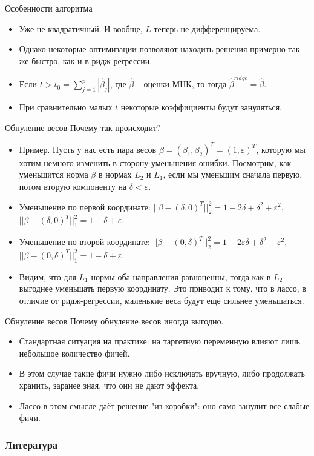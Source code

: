 \documentclass[9pt]{beamer}
\begin{document}
\begin{frame}{Особенности алгоритма}
\begin{itemize}
    \item Уже не квадратичный. И вообще, $L$ теперь не дифференцируема.
    \item Однако некоторые оптимизации позволяют находить решения примерно так же быстро, как и в ридж-регрессии.
    \item Если $t > t_0 = \sum_{j=1}^p|\hat\beta_j|$, где $\hat\beta$ -- оценки МНК, то тогда $\hat\beta^{ridge}=\hat\beta$.
    \item При сравнительно малых $t$ некоторые коэффициенты будут зануляться.
\end{itemize}
\end{frame}

\begin{frame}{Обнуление весов}
Почему так происходит?
\begin{itemize}
    \item Пример. Пусть у нас есть пара весов $\beta = (\beta_1, \beta_2)^T = (1, \varepsilon)^T$, которую мы хотим немного изменить в сторону уменьшения ошибки. Посмотрим, как уменьшится норма $\beta$ в нормах $L_2$ и $L_1$, если мы уменьшим сначала первую, потом вторую компоненту на $\delta < \varepsilon$.
    \item Уменьшение по первой координате: \newline
    $||\beta - (\delta, 0)^T||^2_2 = 1 - 2\delta+\delta^2+\varepsilon^2$,\newline
    $||\beta - (\delta, 0)^T||^2_1 = 1 - \delta +\varepsilon$.
    \item Уменьшение по второй координате: \newline
    $||\beta - (0, \delta)^T||^2_2 = 1 - 2\varepsilon\delta+\delta^2+\varepsilon^2$,\newline
    $||\beta - (0, \delta)^T||^2_1 = 1 - \delta +\varepsilon$.
    \item Видим, что для $L_1$ нормы оба направления равноценны, тогда как в $L_2$ выгоднее уменьшать первую координату. Это приводит к тому, что в лассо, в отличие от ридж-регрессии, маленькие веса будут ещё сильнее уменьшаться.
\end{itemize}
\end{frame}

\begin{frame}{Обнуление весов}
    Почему обнуление весов иногда выгодно.
    \begin{itemize}
        \item Стандартная ситуация на практике: на таргетную переменную влияют лишь небольшое количество фичей.
        \item В этом случае такие фичи нужно либо исключать вручную, либо продолжать хранить, заранее зная, что они не дают эффекта.
        \item Лассо в этом смысле даёт решение "из коробки": оно само занулит все слабые фичи.
    \end{itemize}
\end{frame}
    

\begin{frame}[allowframebreaks]
    \frametitle{Литература}
    
    \nocite{esl}
    
\end{frame}
\end{document}
